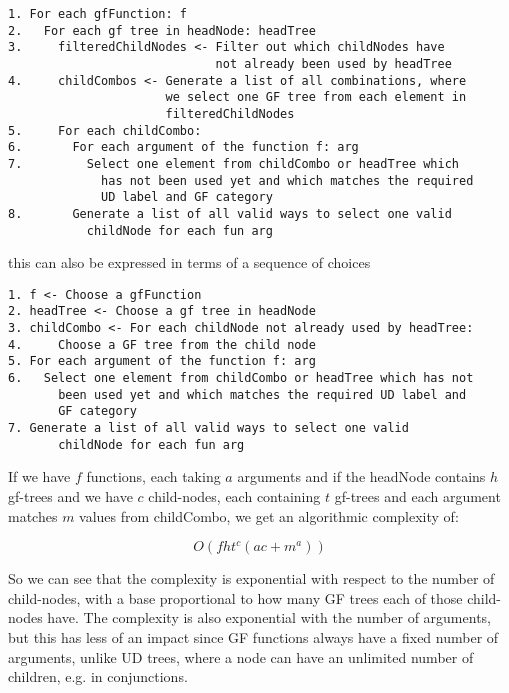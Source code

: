 
\begin{verbatim}
1. For each gfFunction: f
2.   For each gf tree in headNode: headTree
3.     filteredChildNodes <- Filter out which childNodes have
                             not already been used by headTree
4.     childCombos <- Generate a list of all combinations, where
                      we select one GF tree from each element in
                      filteredChildNodes
5.     For each childCombo:
6.       For each argument of the function f: arg
7.         Select one element from childCombo or headTree which
             has not been used yet and which matches the required
             UD label and GF category
8.       Generate a list of all valid ways to select one valid
           childNode for each fun arg
\end{verbatim}

this can also be expressed in terms of a sequence of choices

\begin{verbatim}
1. f <- Choose a gfFunction
2. headTree <- Choose a gf tree in headNode
3. childCombo <- For each childNode not already used by headTree:
4.     Choose a GF tree from the child node
5. For each argument of the function f: arg
6.   Select one element from childCombo or headTree which has not
       been used yet and which matches the required UD label and
       GF category
7. Generate a list of all valid ways to select one valid
       childNode for each fun arg
\end{verbatim}

If we have $f$ functions, each taking $a$ arguments and
if the headNode contains $h$ gf-trees
and we have $c$ child-nodes, each containing $t$ gf-trees
and each argument matches $m$ values from childCombo, we get an algorithmic complexity of:


$$
O(f h t^c (ac+m^a))
$$

So we can see that the complexity is exponential with respect to the number of child-nodes, with a base proportional to how many GF trees each of those child-nodes have. The complexity is also exponential with the number of arguments, but this has less of an impact since GF functions always have a fixed number of arguments, unlike UD trees, where a node can have an unlimited number of children, e.g. in conjunctions.

